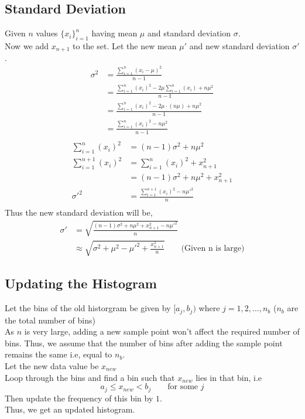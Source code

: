 \documentclass[11pt]{article}
\begin{document}
\subsection*{Standard Deviation}
Given $n$ values $\{x_i\}^n_{i=1}$ having mean $\mu$ and standard deviation $\sigma$. \\
Now we add $x_{n+1}$ to the set. Let the new mean $\mu'$ and new standard deviation $\sigma'$. \\
\begin{equation*}
    \begin{split}
        \sigma^2 &= \frac{\sum_{i=1}^{n} (x_i - \mu)^2}{n-1} \\
            &= \frac{\sum_{i=1}^{n} (x_i)^2 - 2\mu\sum_{i=1}^{n} (x_i) + n\mu^2 }{n-1} \\
            &= \frac{\sum_{i=1}^{n} (x_i)^2 - 2\mu\cdot(n\mu) + n{\mu}^2}{n-1} \\
            &= \frac{\sum_{i=1}^{n} (x_i)^2 - n{\mu}^2}{n-1} \\
    \end{split}
\end{equation*}
\begin{equation*}
    \begin{split}
        \sum_{i=1}^{n} (x_i)^2 &= (n-1)\sigma^2 + n{\mu}^2 \\
        \sum_{i=1}^{n+1} (x_i)^2 &= \sum_{i=1}^{n} (x_i)^2 + x_{n+1}^2 \\
            &= (n-1)\sigma^2 + n{\mu}^2 + x_{n+1}^2 \\
        \sigma'^2 &= \frac{\sum_{i=1}^{n+1} (x_i)^2 - n{\mu'}^2}{n} \\
    \end{split}
\end{equation*}
Thus the new standard deviation will be,
$$
    \begin{aligned}
        \sigma' &= \sqrt{\frac{(n-1)\sigma^2 + n{\mu}^2 + x_{n+1}^2 - n{\mu'}^2}{n}}\\
        &\approx \sqrt{\sigma^2 + \mu^2 - \mu'^2 + \frac{x_{n+1}^2}{n}} \hspace{2em} \text{(Given n is large)}
    \end{aligned}
$$

\subsection*{Updating the Histogram}
Let the bins of the old historgram be given by $[a_j, b_j)$ where $j = 1,2,\ldots,n_b$ ($n_b$ are the total number of bins)\\
As $n$ is very large, adding a new sample point won't affect the required number of bins. Thus, we assume that the number of bins after adding the sample point remains the same i.e, equal to $n_b$.\\
Let the new data value be $x_{new}$\\
Loop through the bins and find a bin such that $x_{new}$ lies in that bin, i.e\\
$$ a_j \le x_{new} < b_j \hspace{2em} \text{for some } j$$
Then update the frequency of this bin by $1$.\\
Thus, we get an updated histogram.\\ 
\end{document}
